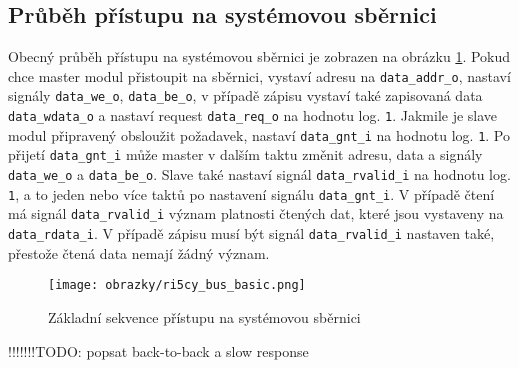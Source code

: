 \subsection{Průběh přístupu na systémovou sběrnici}
Obecný průběh přístupu na systémovou sběrnici je zobrazen na obrázku \ref{fig:ri5cy_bus_basic}. Pokud chce master modul přistoupit na sběrnici, vystaví adresu na \texttt{data\_addr\_o}, nastaví signály \texttt{data\_we\_o}, \texttt{data\_be\_o}, v případě zápisu vystaví také zapisovaná data \texttt{data\_wdata\_o} a nastaví request \texttt{data\_req\_o} na hodnotu log. \texttt{1}. Jakmile je slave modul připravený obsloužit požadavek, nastaví \texttt{data\_gnt\_i} na hodnotu log. \texttt{1}. Po přijetí \texttt{data\_gnt\_i} může master v dalším taktu změnit adresu, data a signály \texttt{data\_we\_o} a \texttt{data\_be\_o}. Slave také nastaví signál \texttt{data\_rvalid\_i} na hodnotu log. \texttt{1}, a to jeden nebo více taktů po nastavení signálu \texttt{data\_gnt\_i}. V případě čtení má signál \texttt{data\_rvalid\_i} význam platnosti čtených dat, které jsou vystaveny na \texttt{data\_rdata\_i}. V případě zápisu musí být signál \texttt{data\_rvalid\_i} nastaven také, přestože čtená data nemají žádný význam. \cite{ri5cy}
 
\begin{figure}[!h]
  \begin{center}
    \texttt{[image: obrazky/ri5cy\_bus\_basic.png]}
  \end{center}
  \caption{Základní sekvence přístupu na systémovou sběrnici \cite{ri5cy}}
	\label{fig:ri5cy_bus_basic}
\end{figure}

!!!!!!!TODO: popsat back-to-back a slow response